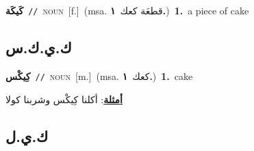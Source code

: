 \documentclass[10pt,a4paper,twoside]{article} %
\begin{document}
\begin{multicols}{2}
{\setlength\topsep{0pt}\textbf{\foreignlanguage{arabic}{كَيكَة}}\ {\color{gray}\texttt{//}\color{black}}\ \textsc{noun}\ [f.]\ \color{gray}(msa. \foreignlanguage{arabic}{قطعَة كعك}~\foreignlanguage{arabic}{\textbf{١.}})\color{black}\ \textbf{1.}~a piece of cake\ } \vspace{2mm}

\vspace{-3mm}
\subsection*{\color{blue}\foreignlanguage{arabic}{ك.ي.ك.س}\color{blue}{ (ntws)}} 

{\setlength\topsep{0pt}\textbf{\foreignlanguage{arabic}{كِيكْس}}\ {\color{gray}\texttt{//}\color{black}}\ \textsc{noun}\ [m.]\ \color{gray}(msa. \foreignlanguage{arabic}{كعك}~\foreignlanguage{arabic}{\textbf{١.}})\color{black}\ \textbf{1.}~cake\  \begin{flushright}\color{gray}\foreignlanguage{arabic}{\textbf{\underline{\foreignlanguage{arabic}{أمثلة}}}: أكلنا كِيكْس وشربنا كولا}\end{flushright}\color{black}} \vspace{2mm}

\vspace{-3mm}
\subsection*{\color{blue}\foreignlanguage{arabic}{ك.ي.ل}\color{blue}{}} 


\end{multicols}
\end{document}
